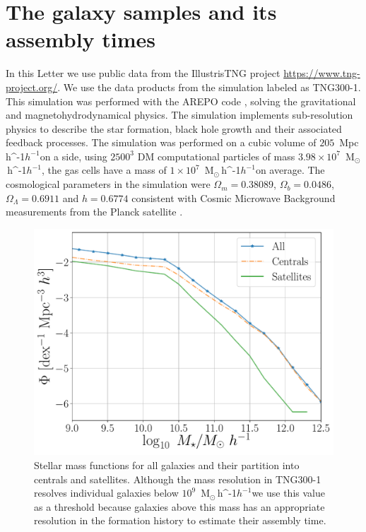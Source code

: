 \documentclass[fleqn,usenatbib]{mnras}
\newcommand{\Msunh}{\,{\rm M}$_{\odot}$\,\ifmmode h^{-1}\else $h^{-1}$\fi}
\newcommand{\Mpch}{\,{\rm Mpc}\,\ifmmode h^{-1}\else $h^{-1}$\fi}
\begin{document}
\section{The galaxy samples and its assembly times}
\label{sec:simul} 

In this Letter we use public data from the IllustrisTNG project
\url{https://www.tng-project.org/}. 
We use the data products from the simulation labeled as TNG300-1.
This simulation was performed with the AREPO code
\citep{2018MNRAS.473.4077P}, solving the gravitational and
magnetohydrodynamical physics. 
The simulation implements sub-resolution physics to describe the
star formation, black hole growth and their associated feedback
processes. 
The simulation was performed on a cubic volume of $205$ \Mpch on a
side, using  $2500^3$ DM computational particles of mass $3.98 \times
10^7$ \Msunh, the gas cells have a mass of $1 \times 10^7$ \Msunh on
average.
The cosmological parameters in the simulation were $\Omega_m=0.38089$,
$\Omega_b=0.0486$, $\Omega_\Lambda= 0.6911$ and $h=0.6774$ consistent
with Cosmic Microwave Background measurements from the Planck satellite
\citep{2016A&A...594A..13P}.  


\begin{figure}
    \centering
    \includegraphics[width=1\columnwidth]{figuras/Histogramas.pdf}
    \caption{Stellar mass functions for all galaxies and their partition
      into centrals and satellites. 
    Although the mass resolution in TNG300-1 resolves individual
    galaxies below $10^{9}$ \Msunh we use this value as a threshold
    because galaxies above this mass has an appropriate resolution in
    the formation history to estimate their assembly time.}
    \label{fig:stellar_fuction}
\end{figure}
\end{document}
